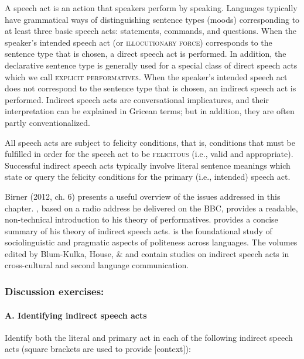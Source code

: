A speech act is an action that speakers perform by speaking. Languages typically have grammatical ways of distinguishing sentence types (moods) corresponding to at least three basic speech acts: statements, commands, and questions. When the speaker’s intended speech act (or \textsc{illocutionary force}) corresponds to the sentence type that is chosen, a direct speech act is performed. In addition, the declarative sentence type is generally used for a special class of direct speech acts which we call \textsc{explicit performatives}. When the speaker’s intended speech act does not correspond to the sentence type that is chosen, an indirect speech act is performed. Indirect speech acts are conversational implicatures, and their interpretation can be explained in Gricean terms; but in addition, they are often partly conventionalized.



All speech acts are subject to felicity conditions, that is, conditions that must be fulfilled in order for the speech act to be \textsc{felicitous} (i.e., valid and appropriate). Successful indirect speech acts typically involve literal sentence meanings which state or query the felicity conditions for the primary (i.e., intended) speech act.



\furtherreading



Birner (2012, ch. 6) presents a useful overview of the issues addressed in this chapter. \citet{Austin1961}, based on a radio address he delivered on the BBC, provides a readable, non-technical introduction to his theory of performatives. \citet{Searle1975} provides a concise summary of his theory of indirect speech acts. \citet{BrownLevinson1978} is the foundational study of sociolinguistic and pragmatic aspects of politeness across languages. The volumes edited by Blum-Kulka, House, \& \citet{Kasper1989} and \citet{GassNeu2006} contain studies on indirect speech acts in cross-cultural and second language communication.


\subsubsection{Discussion exercises:}\label{sec:}
\paragraph{A. Identifying indirect speech acts}
Identify both the literal and primary act in each of the following indirect speech acts (square brackets are used to provide [context]):

